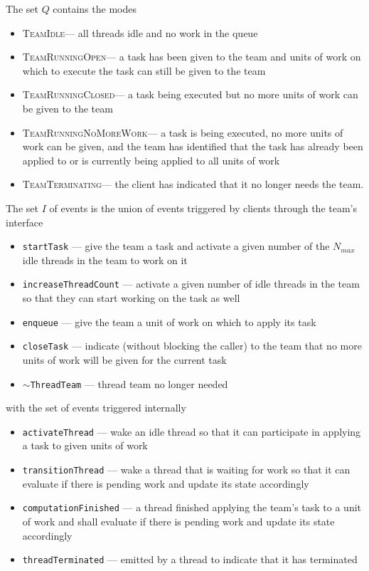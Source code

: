 \documentclass{article}
\newcommand{\TeamIdle}          {\textsc{TeamIdle}}
\newcommand{\TeamRunningOpen}   {\textsc{TeamRunningOpen}}
\newcommand{\TeamRunningClosed} {\textsc{TeamRunningClosed}}
\newcommand{\TeamRunningNoMoreWork} {\textsc{TeamRunningNoMoreWork}}
\newcommand{\TeamTerminating}   {\textsc{TeamTerminating}}
\begin{document}
The set $Q$ contains the modes
\begin{itemize}
\item{\TeamIdle --- all threads idle and no work in the queue}
\item{\TeamRunningOpen --- a task has been given to the team and units of work
on which to execute the task can still be given to the team}
\item{\TeamRunningClosed --- a task being executed but no more units
of work can be given to the team}
\item{\TeamRunningNoMoreWork --- a task is being executed, no more
units of work can be given, and the team has identified that the task has
already been applied to or is currently being applied to all units of work}
\item{\TeamTerminating --- the client has indicated that it no longer needs the team.}
\end{itemize}

The set $I$ of events is the union of events triggered by clients through the
team's interface
\begin{itemize}
\item{\texttt{startTask} --- give the team a task and activate a given number of the
$N_{max}$ idle threads in the team to work on it}
\item{\texttt{increaseThreadCount} --- activate a given number of idle threads in the
team so that they can start working on the task as well}
\item{\texttt{enqueue} --- give the team a unit of work on which to apply its
task}
\item{\texttt{closeTask} --- indicate (without blocking the caller) to the team
that no more units of work will be given for the current task}
\item{\texttt{$\sim$ThreadTeam} --- thread team no longer needed}
\end{itemize}
with the set of events triggered internally
\begin{itemize}
\item{\texttt{activateThread} --- wake an idle thread so that it can participate
in applying a task to given units of work}
\item{\texttt{transitionThread} --- wake a thread that is waiting for work so
that it can evaluate if there is pending work and update its state accordingly}
\item{\texttt{computationFinished} --- a thread finished applying the team's
task to a unit of work and shall evaluate if there is pending work and update
its state accordingly}
\item{\texttt{threadTerminated} --- emitted by a thread to indicate that it has
terminated}
\end{itemize}
\end{document}
